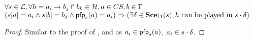 \begin{theorem}
\label{th:hcscomp}
  $\forall s \in \mathcal{L}, \forall h = a_i\rightarrow b_j\Rsh b_k \in \mathcal{H}, a \in CS, b \in \Gamma$\\
  $(\PHget{s}{a} = a_i \wedge \PHget{s}{b} = b_j \wedge \pfp_s(a) = a_i) \Rightarrow (\exists \delta \in \restriction{\Sce}{1}(s), \text{$h$ can be played in $s \PHplay \delta$})$
\end{theorem}
\begin{proof}
  Similar to the proof of , and
  as $a_i \in \mathsf{pfp}_s(a)$, $a_i \in s \cdot \delta$.
\end{proof}

\begin{comment}
\pref{th:autohits} states that any sequence $\zeta$ of self-actions on a well-formed component can be played eventually.
\begin{theorem}
\label{th:autohits}
  Let $a \in \PHs$, $s \in \PHl$ and $\zeta \in \BS$ so that $\forall i \in \indexes{\zeta}, \PHsort(\PHhitter(\zeta_i)) = \PHsort(\PHtarget(\zeta_i)) = a$.
  $\exists (\delta_i)_{i \in \indexes{\zeta}} \in \restriction{\Sce}{1}$ so that $\forall i \in \indexes{\zeta}$, $\zeta_i$ can be played in $s \PHplay \delta_1 \PHplay \zeta_1 \PHplay \dots \PHplay \delta_i$. 
\end{theorem}
\begin{proof}
  With \pref{th:hcompcomp} applied iteratively.
\end{proof}
\end{comment}

